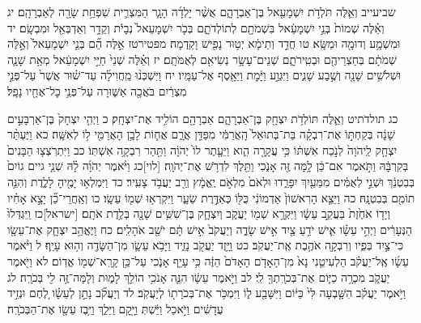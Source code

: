 \documentclass[twoside, openany, parskip=half, 11pt]{book}
\begin{document}
שביעייב וְאֵ֛לֶּה תֹּלְדֹ֥ת יִשְׁמָעֵ֖אל בֶּן־אַבְרָהָ֑ם אֲשֶׁ֨ר יָלְדָ֜ה הָגָ֧ר הַמִּצְרִ֛ית שִׁפְחַ֥ת שָׂרָ֖ה לְאַבְרָהָֽם׃ יג וְאֵ֗לֶּה שְׁמוֹת֙ בְּנֵ֣י יִשְׁמָעֵ֔אל בִּשְׁמֹתָ֖ם לְתוֹלְדֹתָ֑ם בְּכֹ֤ר יִשְׁמָעֵאל֙ נְבָיֹ֔ת וְקֵדָ֥ר וְאַדְבְּאֵ֖ל וּמִבְשָֽׂם׃ יד וּמִשְׁמָ֥ע וְדוּמָ֖ה וּמַשָּֽׂא׃ טו חֲדַ֣ד וְתֵימָ֔א יְט֥וּר נָפִ֖ישׁ וָקֵֽדְמָה׃ מפטירטז אֵ֣לֶּה הֵ֞ם בְּנֵ֤י יִשְׁמָעֵאל֙ וְאֵ֣לֶּה שְׁמֹתָ֔ם בְּחַצְרֵיהֶ֖ם וּבְטִֽירֹתָ֑ם שְׁנֵים־עָשָׂ֥ר נְשִׂיאִ֖ם לְאֻמֹּתָֽם׃ יז וְאֵ֗לֶּה שְׁנֵי֙ חַיֵּ֣י יִשְׁמָעֵ֔אל מְאַ֥ת שָׁנָ֛ה וּשְׁלֹשִׁ֥ים שָׁנָ֖ה וְשֶׁ֣בַע שָׁנִ֑ים וַיִּגְוַ֣ע וַיָּ֔מׇת וַיֵּאָ֖סֶף אֶל־עַמָּֽיו׃ יח וַיִּשְׁכְּנ֨וּ מֵֽחֲוִילָ֜ה עַד־שׁ֗וּר אֲשֶׁר֙ עַל־פְּנֵ֣י מִצְרַ֔יִם בֹּאֲכָ֖ה אַשּׁ֑וּרָה עַל־פְּנֵ֥י כׇל־אֶחָ֖יו נָפָֽל׃

כג תולדֹתיט וְאֵ֛לֶּה תּוֹלְדֹ֥ת יִצְחָ֖ק בֶּן־אַבְרָהָ֑ם אַבְרָהָ֖ם הוֹלִ֥יד אֶת־יִצְחָֽק׃ כ וַיְהִ֤י יִצְחָק֙ בֶּן־אַרְבָּעִ֣ים שָׁנָ֔ה בְּקַחְתּ֣וֹ אֶת־רִבְקָ֗ה בַּת־בְּתוּאֵל֙ הָֽאֲרַמִּ֔י מִפַּדַּ֖ן אֲרָ֑ם אֲח֛וֹת לָבָ֥ן הָאֲרַמִּ֖י ל֥וֹ לְאִשָּֽׁה׃ כא וַיֶּעְתַּ֨ר יִצְחָ֤ק לַֽיהֹוָה֙ לְנֹ֣כַח אִשְׁתּ֔וֹ כִּ֥י עֲקָרָ֖ה הִ֑וא וַיֵּעָ֤תֶר לוֹ֙ יְהֹוָ֔ה וַתַּ֖הַר רִבְקָ֥ה אִשְׁתּֽוֹ׃ כב וַיִּתְרֹֽצְצ֤וּ הַבָּנִים֙ בְּקִרְבָּ֔הּ וַתֹּ֣אמֶר אִם־כֵּ֔ן לָ֥מָּה זֶּ֖ה אָנֹ֑כִי וַתֵּ֖לֶךְ לִדְרֹ֥שׁ אֶת־יְהֹוָֽה׃ [לוי]כג וַיֹּ֨אמֶר יְהֹוָ֜ה לָ֗הּ שְׁנֵ֤י גיים גוֹיִם֙ בְּבִטְנֵ֔ךְ וּשְׁנֵ֣י לְאֻמִּ֔ים מִמֵּעַ֖יִךְ יִפָּרֵ֑דוּ וּלְאֹם֙ מִלְאֹ֣ם יֶֽאֱמָ֔ץ וְרַ֖ב יַעֲבֹ֥ד צָעִֽיר׃ כד וַיִּמְלְא֥וּ יָמֶ֖יהָ לָלֶ֑דֶת וְהִנֵּ֥ה תוֹמִ֖ם בְּבִטְנָֽהּ׃ כה וַיֵּצֵ֤א הָרִאשׁוֹן֙ אַדְמוֹנִ֔י כֻּלּ֖וֹ כְּאַדֶּ֣רֶת שֵׂעָ֑ר וַיִּקְרְא֥וּ שְׁמ֖וֹ עֵשָֽׂו׃ כו וְאַֽחֲרֵי־כֵ֞ן יָצָ֣א אָחִ֗יו וְיָד֤וֹ אֹחֶ֙זֶת֙ בַּעֲקֵ֣ב עֵשָׂ֔ו וַיִּקְרָ֥א שְׁמ֖וֹ יַעֲקֹ֑ב וְיִצְחָ֛ק בֶּן־שִׁשִּׁ֥ים שָׁנָ֖ה בְּלֶ֥דֶת אֹתָֽם׃ [ישראל]כז וַֽיִּגְדְּלוּ֙ הַנְּעָרִ֔ים וַיְהִ֣י עֵשָׂ֗ו אִ֛ישׁ יֹדֵ֥עַ צַ֖יִד אִ֣ישׁ שָׂדֶ֑ה וְיַעֲקֹב֙ אִ֣ישׁ תָּ֔ם יֹשֵׁ֖ב אֹהָלִֽים׃ כח וַיֶּאֱהַ֥ב יִצְחָ֛ק אֶת־עֵשָׂ֖ו כִּי־צַ֣יִד בְּפִ֑יו וְרִבְקָ֖ה אֹהֶ֥בֶת אֶֽת־יַעֲקֹֽב׃ כט וַיָּ֥זֶד יַעֲקֹ֖ב נָזִ֑יד וַיָּבֹ֥א עֵשָׂ֛ו מִן־הַשָּׂדֶ֖ה וְה֥וּא עָיֵֽף׃ ל וַיֹּ֨אמֶר עֵשָׂ֜ו אֶֽל־יַעֲקֹ֗ב הַלְעִיטֵ֤נִי נָא֙ מִן־הָאָדֹ֤ם הָאָדֹם֙ הַזֶּ֔ה כִּ֥י עָיֵ֖ף אָנֹ֑כִי עַל־כֵּ֥ן קָרָֽא־שְׁמ֖וֹ אֱדֽוֹם׃ לא וַיֹּ֖אמֶר יַעֲקֹ֑ב מִכְרָ֥ה כַיּ֛וֹם אֶת־בְּכֹרָֽתְךָ֖ לִֽי׃ לב וַיֹּ֣אמֶר עֵשָׂ֔ו הִנֵּ֛ה אָנֹכִ֥י הוֹלֵ֖ךְ לָמ֑וּת וְלָמָּה־זֶּ֥ה לִ֖י בְּכֹרָֽה׃ לג וַיֹּ֣אמֶר יַעֲקֹ֗ב הִשָּׁ֤בְעָה לִּי֙ כַּיּ֔וֹם וַיִּשָּׁבַ֖ע ל֑וֹ וַיִּמְכֹּ֥ר אֶת־בְּכֹרָת֖וֹ לְיַעֲקֹֽב׃ לד וְיַעֲקֹ֞ב נָתַ֣ן לְעֵשָׂ֗ו לֶ֚חֶם וּנְזִ֣יד עֲדָשִׁ֔ים וַיֹּ֣אכַל וַיֵּ֔שְׁתְּ וַיָּ֖קׇם וַיֵּלַ֑ךְ וַיִּ֥בֶז עֵשָׂ֖ו אֶת־הַבְּכֹרָֽה׃
\end{document}
